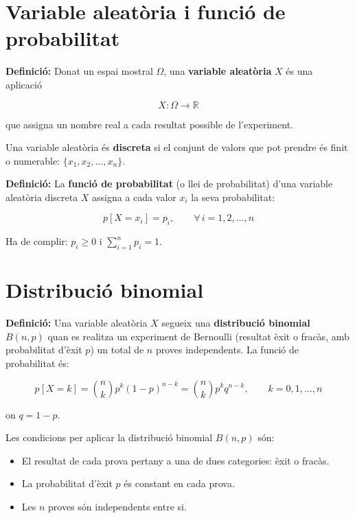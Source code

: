 \section{Variable aleatòria i funció de probabilitat}

\textbf{Definició:} Donat un espai mostral $\Omega$, una \textbf{variable aleatòria} $X$ és una aplicació

\begin{equation}
X: \Omega \to \mathbb{R}
\end{equation}

que assigna un nombre real a cada resultat possible de l'experiment.

Una variable aleatòria és \textbf{discreta} si el conjunt de valors que pot prendre és finit o numerable: $\{x_1, x_2, \ldots, x_n\}$.

\textbf{Definició:} La \textbf{funció de probabilitat} (o llei de probabilitat) d'una variable aleatòria discreta $X$ assigna a cada valor $x_i$ la seva probabilitat:

\begin{equation}
p[X = x_i] = p_i, \qquad \forall\, i = 1, 2, \ldots, n
\end{equation}

Ha de complir: $p_i \ge 0$ i $\displaystyle\sum_{i=1}^{n} p_i = 1$.

\section{Distribució binomial}

\textbf{Definició:} Una variable aleatòria $X$ segueix una \textbf{distribució binomial} $B(n, p)$ quan es realitza un experiment de Bernoulli (resultat èxit o fracàs, amb probabilitat d'èxit $p$) un total de $n$ proves independents. La funció de probabilitat és:

\begin{equation}
p[X = k] = \binom{n}{k}p^k(1-p)^{n-k} = \binom{n}{k}p^kq^{n-k}, \qquad k = 0, 1, \ldots, n
\end{equation}

on $q = 1 - p$.

Les condicions per aplicar la distribució binomial $B(n, p)$ són:

\begin{itemize}
\item El resultat de cada prova pertany a una de dues categories: èxit o fracàs.
\item La probabilitat d'èxit $p$ és constant en cada prova.
\item Les $n$ proves són independents entre si.
\end{itemize}

